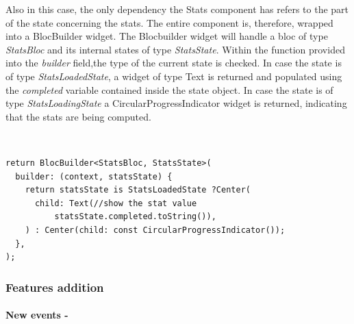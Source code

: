 Also in this case, the only dependency the Stats component has refers to the part of the state concerning the stats. The entire component is, therefore, wrapped into a BlocBuilder widget. The Blocbuilder widget will handle a bloc of type \textit{StatsBloc} and its internal states of type \textit{StatsState}. Within the function provided into the \textit{builder} field,the type of the current state is checked. In case the state is of type \textit{StatsLoadedState},  a widget of type Text is returned and populated using the \textit{completed} variable contained inside the state object. In case the state is of type \textit{StatsLoadingState} a CircularProgressIndicator widget is returned, indicating that the stats are being computed.
\begin{code}
\mbox{}\\
 \mbox{}
\label{code:2.14}
\begin{verbatim}
return BlocBuilder<StatsBloc, StatsState>(
  builder: (context, statsState) {
    return statsState is StatsLoadedState ?Center(
      child: Text(//show the stat value
          statsState.completed.toString()),
    ) : Center(child: const CircularProgressIndicator());
  },
);
\end{verbatim}
\mbox{}
\end{code}

\subsubsection{Features addition}  \label{par:todo_app_inherited_widget_introduction}

\paragraph{New events - }
\label{subpar:todo_app_bloc_core_state}

